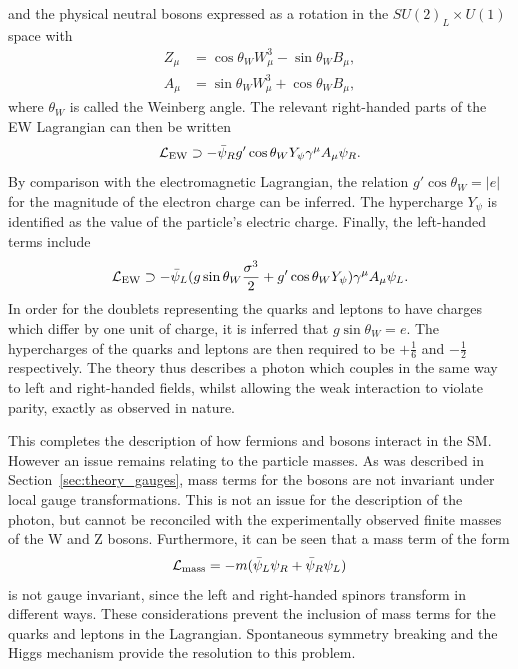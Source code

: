 and the physical neutral bosons expressed as a rotation in the $SU(2)_L \times U(1)$ space with
\begin{equation}
\label{eq:theory_rotation}
\begin{split}
Z_\mu &= \cos{\theta_W} W_\mu^3 - \sin{\theta_W} B_\mu , \\
A_\mu &= \sin{\theta_W} W_\mu^3 + \cos{\theta_W} B_\mu ,
\end{split}
\end{equation}
where $\theta_W$ is called the Weinberg angle.
The relevant right-handed parts of the EW Lagrangian can then be written
\begin{equation}
\mathcal{L}_{\textrm{EW}} \supset -\bar{\psi}_R g' \cos{\theta_W} Y_\psi \gamma^\mu A_\mu \psi_R .
\end{equation}
By comparison with the electromagnetic Lagrangian, 
the relation $g' \cos{\theta_W} = |e|$ for the magnitude of the electron charge can be inferred.
The hypercharge $Y_\psi$ is identified as the value of the particle's electric charge.
Finally, the left-handed terms include
\begin{equation}
\mathcal{L}_{\textrm{EW}} \supset - \bar{\psi}_L(g\sin{\theta_W} \frac{\sigma^3}{2} 
                            + g' \cos{\theta_W} Y_\psi) \gamma^\mu A_\mu \psi_L .
\end{equation}
In order for the doublets representing the quarks and leptons to have charges 
which differ by one unit of charge, it is inferred that $g\sin{\theta_W} = e$. 
The hypercharges of the quarks and leptons are then required to be 
$+\frac{1}{6}$ and $-\frac{1}{2}$ respectively.
The theory thus describes a photon which couples in the same way to left and right-handed fields, 
whilst allowing the weak interaction to violate parity, exactly as observed in nature. 

This completes the description of how fermions and bosons interact in the SM.
However an issue remains relating to the particle masses.
As was described in Section~\ref{sec:theory_gauges}, 
mass terms for the bosons are not invariant under local gauge transformations.
This is not an issue for the description of the photon, 
but cannot be reconciled with the experimentally observed finite masses of the W and Z bosons.
Furthermore, it can be seen that a mass term of the form
\begin{equation}
\label{eq:theory_badmass}
\mathcal{L}_{\textrm{mass}} = -m(\bar{\psi}_L \psi_R + \bar{\psi}_R \psi_L)
\end{equation}
is not gauge invariant, since the left and right-handed spinors transform in different ways.
These considerations prevent the inclusion of mass terms 
for the quarks and leptons in the Lagrangian.
Spontaneous symmetry breaking and the Higgs mechanism provide the resolution to this problem.

